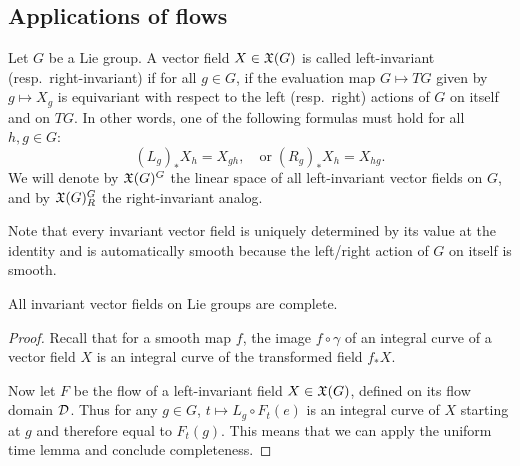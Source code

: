 












\subsection{Applications of flows}\label{sec: applications of flows}



\begin{defn}
    Let $G$ be a Lie group. A vector field $X\in\mathfrak{X}(G)$ is called left-invariant (resp.~right-invariant) if for all $g\in G$, if the evaluation map $G\mapsto TG$ given by $g\mapsto X_g$ is equivariant with respect to the left (resp.~right) actions of $G$ on itself and on $TG$. In other words, one of the following formulas must hold for all $h,g\in G$:
    \[(L_g)_{\ast}X_h=X_{gh},\quad \text{or}\; (R_g)_{\ast}X_h=X_{hg}.\]
    We will denote by $\mathfrak{X}(G)^G$ the linear space of all left-invariant vector fields on $G$, and by $\mathfrak{X}(G)^G_R$ the right-invariant analog.
\end{defn}

Note that every invariant vector field is uniquely determined by its value at the identity and is automatically smooth because the left/right action of $G$ on itself is smooth.

\begin{thm}\label{thm invariant fields are complete}
    All invariant vector fields on Lie groups are complete.
\end{thm}
\begin{proof}
    Recall that for a smooth map $f$, the image $f\circ\gamma$ of an integral curve of a vector field $X$ is an integral curve of the transformed field $f_\ast X$. 
    
    Now let $F$ be the flow of a left-invariant field $X\in \mathfrak{X}(G)$, defined on its flow domain $\mathcal{D}$. Thus for any $g\in G$, $t\mapsto L_g\circ F_t(e)$ is an integral curve of $X$ starting at $g$ and therefore equal to $F_t(g)$. This means that we can apply the uniform time lemma and conclude completeness.
\end{proof}

